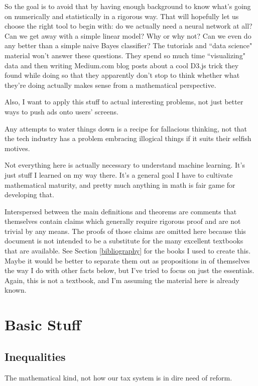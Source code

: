 \documentclass{article}
\theoremstyle{definition}
\begin{document}
So the goal is to avoid that by having enough background to know what's going on numerically and statistically in a rigorous way. That will hopefully let us choose the right tool to begin with: do we actually need a neural network at all? Can we get away with a simple linear model? Why or why not? Can we even do any better than a simple naive Bayes classifier? The tutorials and ``data science" material won't answer these questions. They spend so much time ``visualizing" data and then writing Medium.com blog posts about a cool D3.js trick they found while doing so that they apparently don't stop to think whether what they're doing actually makes sense from a mathematical perspective.

Also, I want to apply this stuff to actual interesting problems, not just better ways to push ads onto users' screens.

Any attempts to water things down is a recipe for fallacious thinking, not that the tech industry has a problem embracing illogical things if it suits their selfish motives.

Not everything here is actually necessary to understand machine learning. It's just stuff I learned on my way there. It's a general goal I have to cultivate mathematical maturity, and pretty much anything in math is fair game for developing that.

Interspersed between the main definitions and theorems are comments that themselves contain claims which generally require rigorous proof and are not trivial by any means. The proofs of those claims are omitted here because this document is not intended to be a substitute for the many excellent textbooks that are available. See Section \ref{bibliography} for the books I used to create this. Maybe it would be better to separate them out as propositions in of themselves the way I do with other facts below, but I've tried to focus on just the essentials. Again, this is not a textbook, and I'm assuming the material here is already known.

\section{Basic Stuff}

\subsection{Inequalities}
The mathematical kind, not how our tax system is in dire need of reform.
\end{document}
